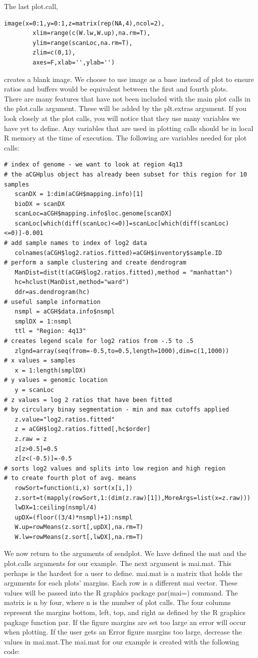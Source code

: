 \documentclass[]{article}
\begin{document}
The last plot.call, 
\begin{verbatim}
image(x=0:1,y=0:1,z=matrix(rep(NA,4),ncol=2),
        xlim=range(c(W.lw,W.up),na.rm=T),
        ylim=range(scanLoc,na.rm=T),
        zlim=c(0,1),
        axes=F,xlab='',ylab='')
\end{verbatim}
creates a blank image. We choose to use image as a base instead of plot to ensure ratios and buffers would be equivalent between the first and fourth plots.
\\
\quad There are many features that have not been included with the main plot calls in the plot.calls argument. These will be added by the plt.extras argument. If you look closely at the plot calls, you will notice that they use many variables we have yet to define. Any variables that are used in plotting calls should be in local R memory at the time of execution. The following are variables needed for plot calls:
\begin{verbatim}
# index of genome - we want to look at region 4q13 
# the aCGHplus object has already been subset for this region for 10 samples
   scanDX = 1:dim(aCGH$mapping.info)[1]
   bioDX = scanDX
   scanLoc=aCGH$mapping.info$loc.genome[scanDX]
   scanLoc[which(diff(scanLoc)<=0)]=scanLoc[which(diff(scanLoc)<=0)]-0.001
# add sample names to index of log2 data
   colnames(aCGH$log2.ratios.fitted)=aCGH$inventory$sample.ID
# perform a sample clustering and create dendrogram 
   ManDist=dist(t(aCGH$log2.ratios.fitted),method = "manhattan")
   hc=hclust(ManDist,method="ward")
   ddr=as.dendrogram(hc)
# useful sample information
   nsmpl = aCGH$data.info$nsmpl
   smplDX = 1:nsmpl
   ttl = "Region: 4q13"
# creates legend scale for log2 ratios from -.5 to .5
   zlgnd=array(seq(from=-0.5,to=0.5,length=1000),dim=c(1,1000))
# x values = samples 
   x = 1:length(smplDX)
# y values = genomic location
   y = scanLoc
# z values = log 2 ratios that have been fitted 
# by circulary binay segmentation - min and max cutoffs applied
   z.value="log2.ratios.fitted"
   z = aCGH$log2.ratios.fitted[,hc$order]
   z.raw = z
   z[z>0.5]=0.5
   z[z<(-0.5)]=-0.5
# sorts log2 values and splits into low region and high region
# to create fourth plot of avg. means 
   rowSort=function(i,x) sort(x[i,])
   z.sort=t(mapply(rowSort,1:(dim(z.raw)[1]),MoreArgs=list(x=z.raw)))
   lwDX=1:ceiling(nsmpl/4)
   upDX=(floor((3/4)*nsmpl)+1):nsmpl
   W.up=rowMeans(z.sort[,upDX],na.rm=T)
   W.lw=rowMeans(z.sort[,lwDX],na.rm=T)
\end{verbatim}

\quad We now return to the arguments of sendplot. We have defined the mat and the plot.calls arguments for our example. The next argument is mai.mat. This perhaps is the hardest for a user to define. mai.mat is a matrix that holds the arguments for each plots' margins. Each row is a different mai vector. These values will be passed into the R graphics package par(mai=) command. The matrix is n by four, where n is the number of plot calls. The four columns represent the margins bottom, left, top, and right as defined by the R graphics pagkage function par. If the figure margins are set too large an error will occur when plotting. If the user gets an Error figure margins too large, decrease the values in mai.mat.The mai.mat for our example is created with the following code:
\end{document}
